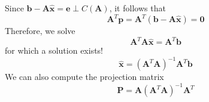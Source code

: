 \documentclass[aspectratio=169]{beamer}
\newcommand{\A}{\mathbf{A}}
\newcommand{\Pro}{\mathbf{P}}
\newcommand{\xx}{\mathbf{x}}
\newcommand{\bb}{\mathbf{b}}
\newcommand{\ee}{\mathbf{e}}
\newcommand{\pp}{\mathbf{p}}
\begin{document}
	\begin{frame}
		
	\end{frame}
	
	\begin{frame}
	Since $\bb - \A \hat{\xx} = \ee \perp C(\A)$, it follows that
	\begin{equation}
		\A^T \pp = 	\A^T (\bb - \A \hat{\xx}) = \mathbf{0}
	\end{equation}
	Therefore, we solve 
	\begin{equation}
		\A^T\A \hat{\xx} = \A^T \bb
	\end{equation}
	for which a solution exists!
		\begin{equation}
	\hat{\xx} = (\A^T\A)^{-1}\A^T \bb
	\end{equation}
	We can also compute the projection matrix
	\begin{equation}
		\Pro = \A(\A^T\A)^{-1}\A^T
	\end{equation}
	\end{frame}
\end{document}
